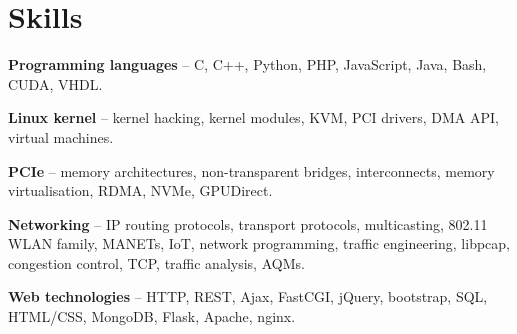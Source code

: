 \section{Skills}
\begin{small}
	\parbox[t][][t]{\linewidth}{
		\textbf{Programming languages} -- C, C++, Python, PHP, JavaScript, Java, Bash, CUDA, VHDL.
		\smallbreak
	}
	\parbox[t][][t]{\linewidth}{
		\textbf{Linux kernel} -- kernel hacking, kernel modules,
		KVM, PCI drivers, DMA API, virtual machines.
		\smallbreak
	}
	\parbox[t][][t]{\linewidth}{
		\textbf{PCIe} -- memory architectures, non-transparent bridges, 
		interconnects, memory virtualisation, RDMA, NVMe, GPUDirect.
		\smallbreak
	}
	\parbox[t][][t]{\linewidth}{
		\textbf{Networking} -- IP routing protocols, transport protocols,
		multicasting, 802.11 WLAN family, MANETs, IoT, network programming, 
		traffic engineering, libpcap, congestion control, TCP, traffic
		analysis, AQMs.
		\smallbreak
	}
	\parbox[t][][t]{\linewidth}{
		\textbf{Web technologies} -- HTTP, REST, Ajax, FastCGI, jQuery,
		bootstrap, SQL, HTML/CSS, MongoDB, Flask, Apache, nginx.
		\smallbreak
	}
\end{small}

